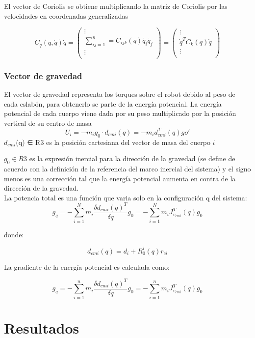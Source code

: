 \documentclass[journal, trans, spanish]{IEEEtran}
\begin{document}
El vector de Coriolis se obtiene multiplicando la matriz de Coriolis por las velocidades en coordenadas generalizadas

$$C_{q}(q,\dot{q})\dot{q}=\begin{pmatrix}
\vdots\\
\sum_{ij=1}^{n}=C_{ijk}(q)\dot{q_{i}}\dot{q_{j}}\\ 
\vdots\\
\end{pmatrix}
=\begin{pmatrix}
\vdots\\
\dot{q}^{T}C_{k}(q)\dot{q}\\ 
\vdots\\
\end{pmatrix}$$

\subsubsection{Vector de gravedad}
El vector de gravedad representa los torques sobre el robot debido al peso de cada eslabón, para obtenerlo se parte de la energía potencial. La energía potencial de cada cuerpo viene dada por su peso multiplicado por la posición vertical de su centro de masa
$$U_{i}=-m_{i}g_{0}\cdot d_{cmi}(q)=-m_{i}d^{T}_{cmi}(q)g{o'}$$
$d_{cmi}$(q) ∈ R3 es la posición cartesiana del vector de masa del cuerpo $i$

$g_0 ∈ R3$ es la expresión inercial para la dirección de la gravedad (se define de acuerdo con la definición de la referencia del marco inercial del sistema) y el signo menos es una corrección tal que la energía potencial aumenta en contra de la dirección de la gravedad.\\
La potencia total es una función que varia solo en la configuración q del sistema: 
$$g_{q}=-\sum_{i=1}^{N}m_{i}\frac{\delta d_{cmi}(q)^{T}}{\delta q}g_{0}=-\sum_{i=1}^{N}m_{i}J_{v_{cmi}}^{T}(q)g_{0}$$

donde:

$$d_{cmi}(q)=d_{i}+R^{i}_{0}(q)r_{ci}$$

La gradiente de la energía potencial es calculada como:

$$g_{q}=- \sum_{i=1}^{n}m_{i}\frac{\delta d_{cmi}(q)^{T}}{\delta q}g_{0}=-\sum_{i=1}^{n}m_{i}J_{v_{cmi}}^{T}(q)g_{0}$$

\section{Resultados}
\end{document}
